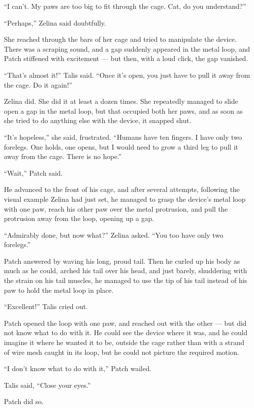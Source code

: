 \documentclass[12pt]{memoir}
\begin{document}
“I can’t. My paws are too big to fit through the cage. Cat, do you
understand?”

“Perhaps,” Zelina said doubtfully.

She reached through the bars of her cage and tried to manipulate the
device. There was a scraping sound, and a gap suddenly appeared in the
metal loop, and Patch stiffened with excitement — but then, with a
loud click, the gap vanished.

“That’s almost it!” Talis said. “Once it’s open, you just have to pull
it away from the cage. Do it again!”

Zelina did. She did it at least a dozen times. She repeatedly managed
to slide open a gap in the metal loop, but that occupied both her
paws, and as soon as she tried to do anything else with the device, it
snapped shut.

“It’s hopeless,” she said, frustrated. “Humans have ten fingers. I
have only two forelegs. One holds, one opens, but I would need to grow
a third leg to pull it away from the cage. There is no hope.”

“Wait,” Patch said.

He advanced to the front of his cage, and after several attempts,
following the visual example Zelina had just set, he managed to grasp
the device’s metal loop with one paw, reach his other paw over the
metal protrusion, and pull the protrusion away from the loop, opening
up a gap.

“Admirably done, but now what?” Zelina asked. “You too have only two
forelegs.”

Patch answered by waving his long, proud tail. Then he curled up his
body as much as he could, arched his tail over his head, and just
barely, shuddering with the strain on his tail muscles, he managed to
use the tip of his tail instead of his paw to hold the metal loop in
place.

“Excellent!” Talis cried out.

Patch opened the loop with one paw, and reached out with the other —
but did not know what to do with it. He could see the device where it
was, and he could imagine it where he wanted it to be, outside the
cage rather than with a strand of wire mesh caught in its loop, but he
could not picture the required motion.

“I don’t know what to do with it,” Patch wailed.

Talis said, “Close your eyes.”

Patch did so.
\end{document}
